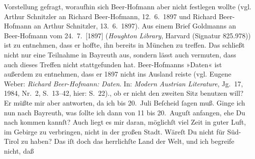 \begin{ledgroupsized}[t]{13cm}
{{{                  Vorstellung gefragt, woraufhin sich Beer-Hofmann aber nicht festlegen wollte (vgl. Arthur Schnitzler an Richard Beer-Hofmann, 12. 6. 1897 und Richard Beer-Hofmann an Arthur Schnitzler,
               13. 6. 1897). Aus einem Brief Goldmanns an Beer-Hofmann vom
                     24. 7. {[}1897{]} (\emph{Houghton Library},
                     Harvard (Signatur 825.978)) ist zu entnehmen, dass
                  er hoffte, ihn bereits in München zu
                  treffen. Das schließt nicht nur eine Teilnahme in Bayreuth aus, sondern
                  lässt auch vermuten, dass auch dieses Treffen nicht stattgefunden hat. Beer-Hofmanns »Daten« ist außerdem zu
                  entnehmen, dass er 1897 nicht ins Ausland reiste
                     (vgl. Eugene Weber: \emph{Richard Beer-Hofmann: Daten}.
                     In: \emph{Modern Austrian Literature}, Jg. 17, 1984, Nr. 2, S. 13–42, hier: S. 22).}}}\label{K_L02817-3h}, ob er
               nicht den zweiten Sitz benutzen will? Er müßte mir aber  antworten, da ich bis 20. Juli
               Beſcheid ſagen muß. Ginge ich nun nach Bayreuth,
               was ſollte ich dann von 11 bis 20. Auguſt anfangen, ehe Du nach \label{K_L02817-4v}\label{K_L02817-4h} kommen kannſt? Auch liegt es mir daran, möglichſt viel
               Zeit in guter Luft, im Gebirge zu verbringen, nicht in der großen Stadt. {\pb}Wäreſt Du nicht für Süd-Tirol zu haben? Das iſt doch das herrlichſte Land der Welt, und ich begreife nicht, daß

\end{ledgroupsized}

